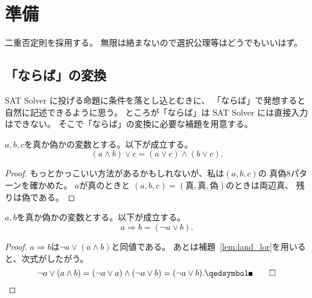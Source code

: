 
\section{準備}

二重否定則を採用する。
無限は絡まないので選択公理等はどうでもいいはず。

\subsection{「ならば」の変換}

SAT Solver に投げる命題に条件を落とし込とむきに、
「ならば」で発想すると自然に記述できるように思う。
ところが「ならば」は SAT Solver には直接入力はできない。
そこで「ならば」の変換に必要な補題を用意する。

\begin{lem} \label{lem:land_lor}
 $a, b, c$を真か偽かの変数とする。以下が成立する。
 \[
 (a \land b) \lor c = (a \lor c) \land (b \lor c).
 \]
\end{lem}

\begin{proof}
 もっとかっこいい方法があるかもしれないが、私は$(a, b, c)$の
 真偽$8$パターンを確かめた。
 $a$が真のときと
 $(a, b, c) = (\text{真}, \text{真}, \text{偽})$のときは両辺真、
 残りは偽である。\qedhere
\end{proof}

\begin{cor} \label{cor:rightarrow}
 $a, b$を真か偽かの変数とする。以下が成立する。
 \[
  a \Rightarrow b = (\lnot a \lor b).
 \]
\end{cor}

\begin{proof}
 $a \Rightarrow b$は$\lnot a \lor (a \land b)$と同値である。
 あとは補題~\ref{lem:land_lor}を用いると、次式がしたがう。
 \[
  \lnot a \lor (a \land b) = (\lnot a \lor a) \land (\lnot a \lor b)
 = (\lnot a \lor b). \qedhere
 \]
\end{proof}

